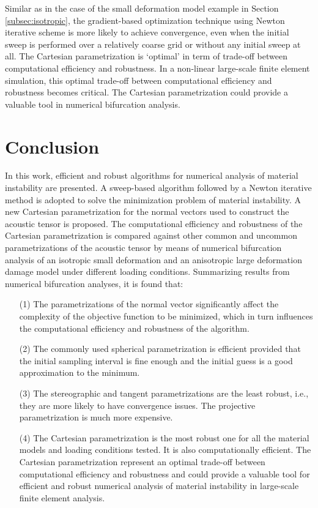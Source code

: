 \documentclass[12pt]{article}
\numberwithin{equation}{section}
\begin{document}
Similar as in the case of the small deformation model example in
Section \ref{subsec:isotropic}, the gradient-based optimization
technique using Newton iterative scheme is more likely to achieve
convergence, even when the initial sweep is performed over a
relatively coarse grid or without any initial sweep at all. The
Cartesian parametrization is `optimal' in term of trade-off between
computational efficiency and robustness. In a non-linear large-scale
finite element simulation, this optimal trade-off between
computational efficiency and robustness becomes critical. The
Cartesian parametrization could provide a valuable tool in numerical
bifurcation analysis.

\section{Conclusion}

In this work, efficient and robust algorithms for numerical analysis
of material instability are presented. A sweep-based algorithm
followed by a Newton iterative method is adopted to solve the
minimization problem of material instability. A new Cartesian
parametrization for the normal vectors used to construct the acoustic
tensor is proposed. The computational efficiency and robustness of the
Cartesian parametrization is compared against other common and
uncommon parametrizations of the acoustic tensor by means of numerical
bifurcation analysis of an isotropic small deformation and an
anisotropic large deformation damage model under different loading
conditions. Summarizing results from numerical bifurcation analyses,
it is found that:

\begin{enumerate}
\item[(1)]
The parametrizations of the normal vector significantly affect the
complexity of the objective function to be minimized, which in turn
influences the computational efficiency and robustness of the
algorithm.

\item[(2)]
The commonly used spherical parametrization is efficient provided
that the initial sampling interval is fine enough and the initial
guess is a good approximation to the minimum.

\item[(3)]
The stereographic and tangent parametrizations are the least
robust, i.e., they are more likely to have convergence issues. The
projective parametrization is much more expensive.

\item[(4)]
The Cartesian parametrization is the most robust one for all the
material models and loading conditions tested. It is also
computationally efficient. The Cartesian parametrization represent an
optimal trade-off between computational efficiency and robustness and
could provide a valuable tool for efficient and robust numerical
analysis of material instability in large-scale finite element
analysis.
\end{enumerate}

%


\end{document}
